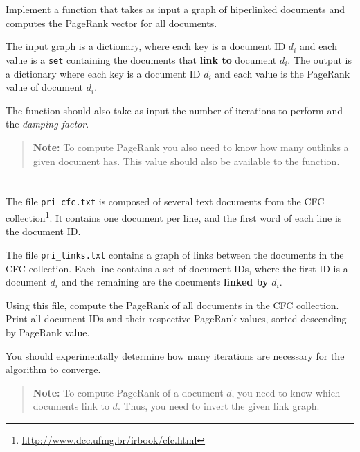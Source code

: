 \documentclass[12pt]{article}
\begin{document}

\section{}

Implement a function that takes as input a graph of hiperlinked documents and
computes the PageRank vector for all documents.

The input graph is a dictionary, where each key is a document ID $d_i$ and each
value is a \texttt{set} containing the documents that \textbf{link to} document
$d_i$. The output is a dictionary where each key is a document ID $d_i$ and
each value is the PageRank value of document $d_i$.

The function should also take as input the number of iterations to perform and
the \emph{damping factor}.

\begin{quote}
    \textbf{Note:} To compute PageRank you also need to know how many outlinks
    a given document has. This value should also be available to the function.
\end{quote}

\section{}

The file \texttt{pri\_cfc.txt} is composed of several text documents from
the CFC collection\footnote{\url{http://www.dcc.ufmg.br/irbook/cfc.html}}. It
contains one document per line, and the first word of each line is the
document ID.

The file \texttt{pri\_links.txt} contains a graph of links between the
documents in the CFC collection. Each line contains
a set of document IDs, where the first ID is a document $d_i$ and the remaining
are the documents \textbf{linked by} $d_i$.

Using this file, compute the PageRank of all documents in the CFC
collection. Print all document IDs and their respective PageRank values, sorted
descending by PageRank value.

You should experimentally determine how many iterations are necessary for the
algorithm to converge.

\begin{quote}
    \textbf{Note:} To compute PageRank of a document $d$, you need to know
    which documents link to $d$. Thus, you need to invert the given link graph.
\end{quote}
\end{document}
